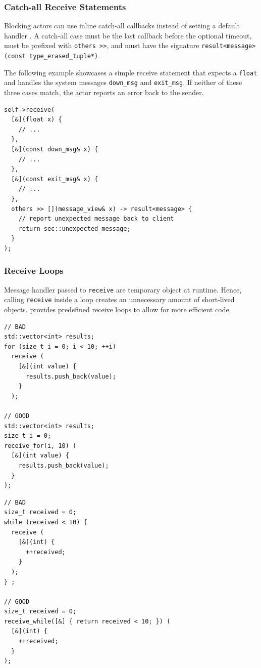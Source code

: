 \subsubsection{Catch-all Receive Statements}
\label{catch-all}

Blocking actors can use inline catch-all callbacks instead of setting a default handler . A catch-all case must be the last callback before the optional timeout, must be prefixed with \lstinline^others >>^, and must have the signature \lstinline^result<message> (const type_erased_tuple*)^.

The following example showcases a simple receive statement that expects a \lstinline^float^ and handles the system messages \lstinline^down_msg^ and \lstinline^exit_msg^. If neither of these three cases match, the actor reports an error back to the sender.

\begin{lstlisting}
self->receive(
  [&](float x) {
    // ...
  },
  [&](const down_msg& x) {
    // ...
  },
  [&](const exit_msg& x) {
    // ...
  },
  others >> [](message_view& x) -> result<message> {
    // report unexpected message back to client
    return sec::unexpected_message;
  }
);
\end{lstlisting}

\clearpage
\subsubsection{Receive Loops}
\label{receive-loop}

Message handler passed to \lstinline^receive^ are temporary object at runtime.
Hence, calling \lstinline^receive^ inside a loop creates an unnecessary amount of short-lived objects.
\lib provides predefined receive loops to allow for more efficient code.

\begin{lstlisting}
// BAD
std::vector<int> results;
for (size_t i = 0; i < 10; ++i)
  receive (
    [&](int value) {
      results.push_back(value);
    }
  );

// GOOD
std::vector<int> results;
size_t i = 0;
receive_for(i, 10) (
  [&](int value) {
    results.push_back(value);
  }
);
\end{lstlisting}

\begin{lstlisting}
// BAD
size_t received = 0;
while (received < 10) {
  receive (
    [&](int) {
      ++received;
    }
  );
} ;

// GOOD
size_t received = 0;
receive_while([&] { return received < 10; }) (
  [&](int) {
    ++received;
  }
);
\end{lstlisting}
\clearpage

